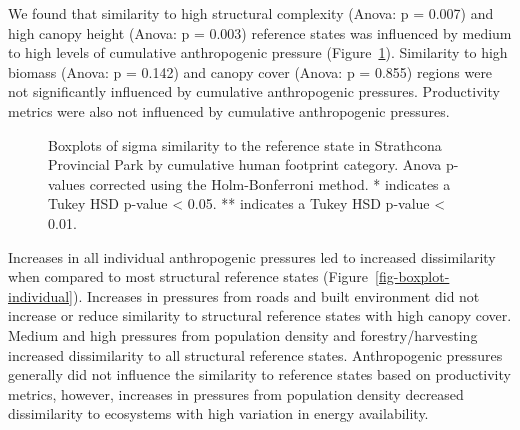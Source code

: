 \documentclass[
]{agujournal2019}
\begin{document}
We found that similarity to high structural complexity (Anova: p =
0.007) and high canopy height (Anova: p = 0.003) reference states was
influenced by medium to high levels of cumulative anthropogenic pressure
(Figure~\ref{fig-boxplot-overall}). Similarity to high biomass (Anova: p
= 0.142) and canopy cover (Anova: p = 0.855) regions were not
significantly influenced by cumulative anthropogenic pressures.
Productivity metrics were also not influenced by cumulative
anthropogenic pressures.

\label{cell-fig-boxplot-overall}
\begin{figure}[H]


\caption{\label{fig-boxplot-overall}Boxplots of sigma similarity to the
reference state in Strathcona Provincial Park by cumulative human
footprint category. Anova p-values corrected using the Holm-Bonferroni
method. * indicates a Tukey HSD p-value \textless{} 0.05. ** indicates a
Tukey HSD p-value \textless{} 0.01.}

\end{figure}%

Increases in all individual anthropogenic pressures led to increased
dissimilarity when compared to most structural reference states
(Figure~\ref{fig-boxplot-individual}). Increases in pressures from roads
and built environment did not increase or reduce similarity to
structural reference states with high canopy cover. Medium and high
pressures from population density and forestry/harvesting increased
dissimilarity to all structural reference states. Anthropogenic
pressures generally did not influence the similarity to reference states
based on productivity metrics, however, increases in pressures from
population density decreased dissimilarity to ecosystems with high
variation in energy availability.
\end{document}
